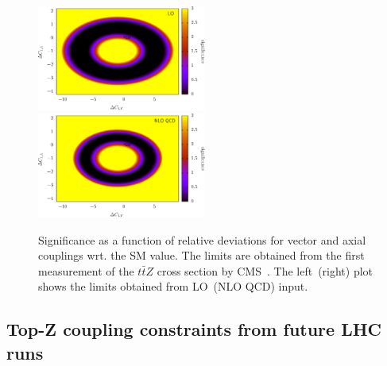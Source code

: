 \documentclass[preprint]{JHEP3}
\def\ttbZ{t\bar{t}Z}
\begin{document}
\begin{figure}[t]
\centering %
\includegraphics[width=0.495\textwidth]{./CMSLO_Delta0.40_0213.eps}
\includegraphics[width=0.495\textwidth]{./CMSNLO_Delta0.20_0213.eps}
\caption{\label{fig:v}
Significance as a function of relative deviations for vector and axial couplings wrt. the SM value. 
The limits are obtained from the first measurement of the $\ttbZ$ cross section by CMS~\cite{Chatrchyan:2013qca}. 
The left~(right) plot shows the limits obtained from LO~(NLO QCD) input.
}
\end{figure}

\subsection{Top-Z coupling constraints from future LHC runs}
\end{document}
